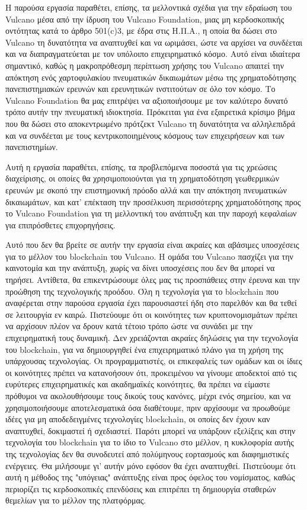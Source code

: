 \documentclass[A4paper, 12pt]{article}
\begin{document}
Η παρούσα εργασία παραθέτει, επίσης, τα μελλοντικά σχέδια για την εδραίωση του Vulcano μέσα από την ίδρυση του Vulcano Foundation, μιας μη κερδοσκοπικής οντότητας κατά το άρθρο 501(c)3, με έδρα στις Η.Π.Α., η οποία θα δώσει στο Vulcano τη δυνατότητα να αναπτυχθεί και να ωριμάσει, ώστε να αρχίσει να συνδέεται και να διαπραγματεύεται με τον υπόλοιπο επιχειρηματικό κόσμο. Αυτό είναι ιδιαίτερα σημαντικό, καθώς η μακροπρόθεσμη περίπτωση χρήσης του Vulcano απαιτεί την απόκτηση ενός χαρτοφυλακίου πνευματικών δικαιωμάτων μέσω της χρηματοδότησης πανεπιστημιακών ερευνών και ερευνητικών ινστιτούτων σε όλο τον κόσμο. Το Vulcano Foundation θα μας επιτρέψει να αξιοποιήσουμε με τον καλύτερο δυνατό τρόπο αυτήν την πνευματική ιδιοκτησία. Πρόκειται για ένα εξαιρετικά κρίσιμο βήμα που θα δώσει στο αποκεντρωμένο πρότζεκτ Vulcano τη δυνατότητα να αλληλεπιδρά και να συνδέεται με τους κεντρικοποιημένους κόσμους των επιχειρήσεων και των πανεπιστημίων.

Αυτή η εργασία παραθέτει, επίσης, τα προβλεπόμενα ποσοστά για τις χρεώσεις διαχείρισης, οι οποίες θα χρησιμοποιούνται για τη χρηματοδότηση γεωθερμικών ερευνών με σκοπό την επιστημονική πρόοδο αλλά και την απόκτηση πνευματικών δικαιωμάτων, και κατ' επέκταση την προσέλκυση περισσότερης χρηματοδότησης προς το Vulcano Foundation για τη μελλοντική του ανάπτυξη και την παροχή κεφαλαίων για επιπρόσθετες επιχορηγήσεις.

Αυτό που δεν θα βρείτε σε αυτήν την εργασία είναι ακραίες και αβάσιμες υποσχέσεις για το μέλλον του blockchain του Vulcano. Η ομάδα του Vulcano πασχίζει για την καινοτομία και την ανάπτυξη, χωρίς να δίνει υποσχέσεις που δεν θα μπορεί να τηρήσει. Αντίθετα, θα επικεντρώσουμε όλες μας τις προσπάθειες στην έρευνα και την προώθηση της τεχνολογικής προόδου. Όλη η τεχνολογία για το blockchain που αναφέρεται στην παρούσα εργασία έχει παρουσιαστεί ήδη στο παρελθόν και θα τεθεί σε λειτουργία εν καιρώ. Πιστεύουμε ότι οι κοινότητες των κρυπτονομισμάτων πρέπει να αρχίσουν πλέον να δρουν κατά τέτοιο τρόπο ώστε να συνάδει με την επιχειρηματική τους δυναμική. Δεν χρειάζονται ακραίες δηλώσεις για την τεχνολογία του blockchain, για να δημιουργηθεί ένα επιχειρηματικό πλάνο για τη χρήση της υπάρχουσας τεχνολογίας. Οι προγραμματιστές, οι επικεφαλείς των ομάδων και οι ίδιες οι κοινότητες πρέπει να κατανοήσουν ότι, προκειμένου να γίνουμε αποδεκτοί από τις ευρύτερες επιχειρηματικές και ακαδημαϊκές κοινότητες, θα πρέπει να είμαστε πρόθυμοι να ακολουθήσουμε τους δικούς τους κανόνες, μέχρι ενός σημείου, και να χρησιμοποιήσουμε αποτελεσματικά όσα διαθέτουμε, πριν αρχίσουμε να προωθούμε ιδέες για μη αποδεδειγμένες τεχνολογίες blockchain, οι οποίες δεν έχουν καν αναπτυχθεί, δοκιμαστεί ή σχεδιαστεί. Παρότι μπορεί να υπάρξουν εξελίξεις και στην τεχνολογία του blockchain για το ίδιο το Vulcano στο μέλλον, η κυκλοφορία αυτής της τεχνολογίας δεν θα συνοδευτεί από πολύμηνους εορτασμούς και διαφημιστικές ενέργειες. Θα μιλήσουμε γι' αυτήν μόνο εφόσον θα έχει αναπτυχθεί. Πιστεύουμε ότι αυτή η μέθοδος της "υπόγειας" ανάπτυξης είναι προς όφελος του νομίσματος, καθώς περιορίζει τις κερδοσκοπικές επενδύσεις και επιτρέπει τη δημιουργία σταθερών θεμελίων για το μέλλον της πλατφόρμας.
\end{document}
